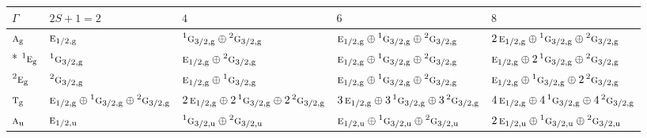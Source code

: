 \documentclass[10pt,a4paper]{article}
\numberwithin{equation}{section}
\newcommand{\irr}[1]{\text{\normalfont\scshape #1}}
\newcommand{\conjpair}[1]{{}^{#1}}
\newcommand{\ptag}[1]{\mathrm{#1}}
\begin{document}
{\small\setlength{\tabcolsep}{3pt}\begin{longtable}{@{}l>{\RaggedRight\arraybackslash}p{}>{\RaggedRight\arraybackslash}p{}>{\RaggedRight\arraybackslash}p{}>{\RaggedRight\arraybackslash}p{}@{}}\toprule
$\Gamma$ & $2S + 1 = 2$ & $4$ & $6$ & $8$\\\midrule\endhead
\bottomrule\endfoot\endlastfoot
$\irr{a}_{\ptag{g}}$ & $\irr{e}_{1/2,\ptag{g}}$ & $\conjpair{1}\irr{g}_{3/2,\ptag{g}}\oplus \conjpair{2}\irr{g}_{3/2,\ptag{g}}$ & $\irr{e}_{1/2,\ptag{g}}\oplus \conjpair{1}\irr{g}_{3/2,\ptag{g}}\oplus \conjpair{2}\irr{g}_{3/2,\ptag{g}}$ & $2\,\irr{e}_{1/2,\ptag{g}}\oplus \conjpair{1}\irr{g}_{3/2,\ptag{g}}\oplus \conjpair{2}\irr{g}_{3/2,\ptag{g}}$\\*
$\conjpair{1}\irr{e}_{\ptag{g}}$ & $\conjpair{1}\irr{g}_{3/2,\ptag{g}}$ & $\irr{e}_{1/2,\ptag{g}}\oplus \conjpair{2}\irr{g}_{3/2,\ptag{g}}$ & $\irr{e}_{1/2,\ptag{g}}\oplus \conjpair{1}\irr{g}_{3/2,\ptag{g}}\oplus \conjpair{2}\irr{g}_{3/2,\ptag{g}}$ & $\irr{e}_{1/2,\ptag{g}}\oplus 2\,\conjpair{1}\irr{g}_{3/2,\ptag{g}}\oplus \conjpair{2}\irr{g}_{3/2,\ptag{g}}$\\
$\conjpair{2}\irr{e}_{\ptag{g}}$ & $\conjpair{2}\irr{g}_{3/2,\ptag{g}}$ & $\irr{e}_{1/2,\ptag{g}}\oplus \conjpair{1}\irr{g}_{3/2,\ptag{g}}$ & $\irr{e}_{1/2,\ptag{g}}\oplus \conjpair{1}\irr{g}_{3/2,\ptag{g}}\oplus \conjpair{2}\irr{g}_{3/2,\ptag{g}}$ & $\irr{e}_{1/2,\ptag{g}}\oplus \conjpair{1}\irr{g}_{3/2,\ptag{g}}\oplus 2\,\conjpair{2}\irr{g}_{3/2,\ptag{g}}$\\
$\irr{t}_{\ptag{g}}$ & $\irr{e}_{1/2,\ptag{g}}\oplus \conjpair{1}\irr{g}_{3/2,\ptag{g}}\oplus \conjpair{2}\irr{g}_{3/2,\ptag{g}}$ & $2\,\irr{e}_{1/2,\ptag{g}}\oplus 2\,\conjpair{1}\irr{g}_{3/2,\ptag{g}}\oplus 2\,\conjpair{2}\irr{g}_{3/2,\ptag{g}}$ & $3\,\irr{e}_{1/2,\ptag{g}}\oplus 3\,\conjpair{1}\irr{g}_{3/2,\ptag{g}}\oplus 3\,\conjpair{2}\irr{g}_{3/2,\ptag{g}}$ & $4\,\irr{e}_{1/2,\ptag{g}}\oplus 4\,\conjpair{1}\irr{g}_{3/2,\ptag{g}}\oplus 4\,\conjpair{2}\irr{g}_{3/2,\ptag{g}}$\\
$\irr{a}_{\ptag{u}}$ & $\irr{e}_{1/2,\ptag{u}}$ & $\conjpair{1}\irr{g}_{3/2,\ptag{u}}\oplus \conjpair{2}\irr{g}_{3/2,\ptag{u}}$ & $\irr{e}_{1/2,\ptag{u}}\oplus \conjpair{1}\irr{g}_{3/2,\ptag{u}}\oplus \conjpair{2}\irr{g}_{3/2,\ptag{u}}$ & $2\,\irr{e}_{1/2,\ptag{u}}\oplus \conjpair{1}\irr{g}_{3/2,\ptag{u}}\oplus \conjpair{2}\irr{g}_{3/2,\ptag{u}}$\\

\end{longtable}}
\end{document}
